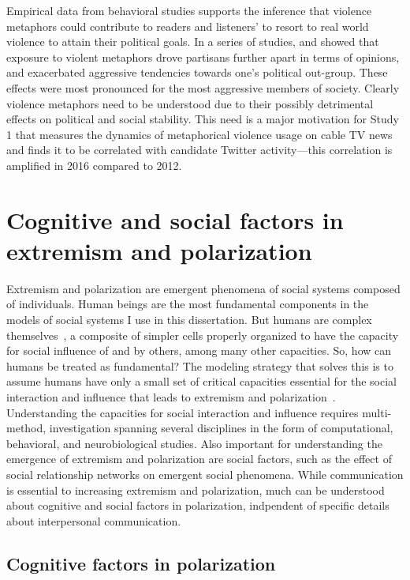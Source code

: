 Empirical data from behavioral studies supports the inference
that violence metaphors could contribute to readers and 
listeners' to resort to real world violence to attain their political goals.
In a series of studies,  and  showed that
exposure to violent metaphors drove partisans further apart in terms of opinions, and 
exacerbated aggressive tendencies towards one's political out-group. These effects
were most pronounced for the most aggressive members of society. Clearly violence
metaphors need to be understood due to their possibly detrimental 
effects on political and social stability. This need is a major motivation for
Study 1 that measures the dynamics of metaphorical violence usage on cable
TV news and finds it to be correlated with candidate Twitter activity---this
correlation is amplified in 2016 compared to 2012.


\section{Cognitive and social factors in extremism and polarization}

Extremism and polarization are emergent phenomena of social systems composed
of individuals. Human beings are the most fundamental components in the
models of social systems I use in this dissertation. 
But humans are complex themselves~\cite{Kello2007,Spivey2020},
a composite of simpler cells properly organized to have the capacity for
social influence of and by others, among many other capacities. 
So, how can humans be treated as fundamental?
The modeling strategy that solves this is to assume humans 
have only a small set of critical
capacities essential for the social interaction and 
influence that leads to extremism and polarization~\cite{Cartwright1989,Smaldino2017}. 
Understanding the capacities for social interaction and influence requires multi-method,
investigation spanning several disciplines in the form of computational,
behavioral, and neurobiological studies. Also important for understanding
the emergence of extremism and polarization are social factors, such as
the effect of social relationship networks on emergent
social phenomena. While communication is essential to increasing extremism and
polarization, much can be understood about cognitive and social factors
in polarization, indpendent of specific details about interpersonal 
communication.



\subsection{Cognitive factors in polarization}

